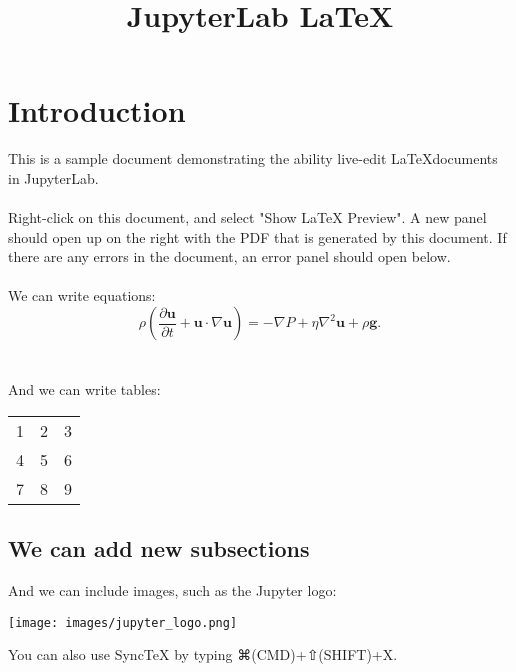 \documentclass{article}
\begin{document}
\title{JupyterLab \LaTeX}
\date{}
\maketitle

\section{Introduction}
This is a sample document demonstrating the ability live-edit
\LaTeX documents in JupyterLab.
\\
\\
Right-click on this document, and select "Show LaTeX Preview".
A new panel should open up on the right with the PDF that is generated
by this document. If there are any errors in the document, an
error panel should open below.
\\
\\
We can write equations:
\begin{equation}
    \rho \left( \frac{\partial \mathbf{u}}{\partial t} + \mathbf{u} \cdot \nabla \mathbf{u} \right) =
    -\nabla P + \eta \nabla^2 \mathbf{u} + \rho \mathbf{g}.
\end{equation}
\\
\\
And we can write tables:
\begin{center}
  \begin{tabular}{ | l | c | r| }
    \hline
    1 & 2 & 3 \\ 
    4 & 5 & 6 \\ 
    7 & 8 & 9 \\
    \hline
  \end{tabular}
\end{center}

\subsection{We can add new subsections}
And we can include images, such as the Jupyter logo:
\begin{center}
  \texttt{[image: images/jupyter\_logo.png]}
\end{center}



\pagebreak




You can also use SyncTeX by typing ⌘(CMD)+⇧(SHIFT)+X.
\end{document}

